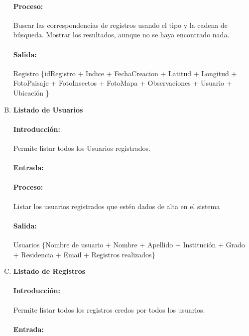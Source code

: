 \begin{enumerate}[A.]
        \paragraph{Proceso:} Buscar las correspondencias de registros usando el tipo y la cadena de búsqueda. Mostrar los resultados, aunque no se haya encontrado nada.
        
        \paragraph{Salida:} Registro \{idRegistro + Indice + FechaCreacion + Latitud + Longitud + FotoPaisaje + FotoInsectos + FotoMapa + Observaciones + Usuario + Ubicación \}
        
        \item \textbf{Listado de Usuarios}
        
        \paragraph{Introducción:} Permite listar todos los Usuarios registrados.
        
        \paragraph{Entrada:}
        
        \paragraph{Proceso:} Listar los usuarios registrados que estén dados de alta en el sistema
        
        \paragraph{Salida:} Usuarios \{Nombre de usuario + Nombre + Apellido + Institución + Grado + Residencia + Email + Registros realizados\}

        \item \textbf{Listado de Registros}
        
        \paragraph{Introducción:} Permite listar todos los registros credos por todos los usuarios.
        
        \paragraph{Entrada:} 
        

\end{enumerate}
